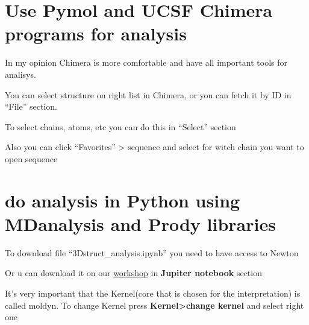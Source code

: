 \documentclass{article}
\begin{document}




\section{Use Pymol and UCSF Chimera programs for analysis}

In my opinion Chimera is more comfortable and have all important tools for analisys.

You can select structure on right list in Chimera, or you can fetch it by ID in ``File'' section.

To select chains, atoms, etc you can do this in ``Select'' section

Also you can click ``Favorites'' > sequence and select for witch chain you want to open sequence








\section{do analysis in Python using MDanalysis and Prody libraries}

To download file ``3Dstruct\_analysis.ipynb'' you need to have access to Newton 

Or u can download it on our  \href{http://intbio.org/mol_model_course/workshops/3Dstruct_analysis/}{workshop} in \textbf{Jupiter notebook} section

It's very important that the Kernel(core that is chosen for the interpretation) is called moldyn. To change Kernel press \textbf{Kernel>change kernel} and select right one
\end{document}
